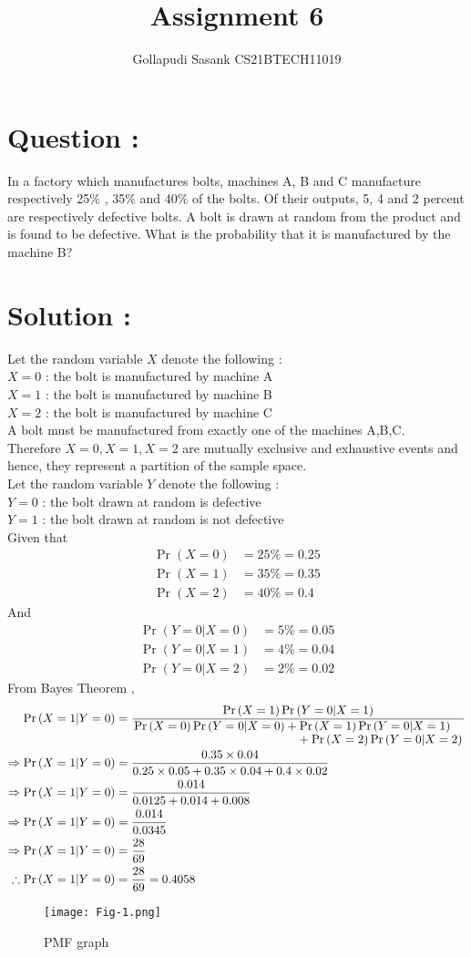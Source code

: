 \documentclass[journal,twocolumn]{IEEEtran}
\title{Assignment 6}
\author{Gollapudi Sasank CS21BTECH11019}
\providecommand{\pr}[1]{\ensuremath{\Pr\left(#1\right)}}
\begin{document}
\maketitle
\section*{Question : }
In a factory which manufactures bolts, machines A, B and C manufacture
respectively 25\% , 35\% and 40\% of the bolts. Of their outputs, 5, 4 and 2 percent are respectively defective bolts. A bolt is drawn at random from the product and is found to be defective. What is the probability that it is manufactured by the machine B?
\section*{Solution : }
Let  the random variable $X$ denote the following : \\
$X=0$ : the bolt is manufactured by machine A \\
$X=1$ : the bolt is manufactured by machine B \\
$X=2$ : the bolt is manufactured by machine C \\
A bolt must be manufactured from exactly one of the machines A,B,C.\\
Therefore $X=0,X=1,X=2$ are mutually exclusive and exhaustive events and hence, they represent a partition of the sample space.\\
Let the random variable $Y$ denote the following : \\
$Y=0$ : the bolt drawn at random is defective \\
$Y=1$ : the bolt drawn at random is not defective \\
Given that 
\begin{align}
\pr{X=0} &= 25\% = 0.25 \\
\pr{X=1} &= 35\% = 0.35 \\
\pr{X=2} &= 40\% = 0.4 
\end{align} 
And 
\begin{align}
\pr{Y=0|X=0} &= 5\% = 0.05 \\
\pr{Y=0|X=1} &= 4\% = 0.04 \\
\pr{Y=0|X=2} &= 2\% = 0.02
\end{align}
From Bayes Theorem , \\
\begin{align}
\pr{X=1|Y=0} &= \frac{\pr{X=1}\pr{Y=0|X=1}}{\splitfrac{\pr{X=0}\pr{Y=0|X=0}+\pr{X=1} \pr{Y=0|X=1}}{+\pr{X=2}\pr{Y=0|X=2}}} \\
\Rightarrow \pr{X=1|Y=0} &= \frac{0.35 \times 0.04}{0.25 \times 0.05 + 0.35 \times 0.04 + 0.4 \times 0.02 } \\
\Rightarrow \pr{X=1|Y=0} &= \frac{0.014}{0.0125+0.014+0.008} \\
\Rightarrow \pr{X=1|Y=0} &= \frac{0.014}{0.0345} \\ 
\Rightarrow \pr{X=1|Y=0} &= \frac{28}{69} \\ 
\therefore  \pr{X=1|Y=0} &= \frac{28}{69} = 0.4058 
\end{align}
\begin{figure}[h]
\texttt{[image: Fig-1.png]}
\caption{PMF graph}
\label{Fig 1}
\end{figure}
\end{document}

